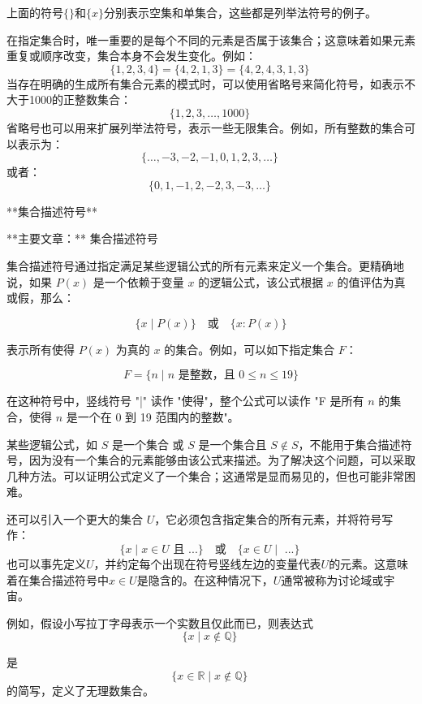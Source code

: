 上面的符号\( \{\} \)和\( \{x\} \)分别表示空集和单集合，这些都是列举法符号的例子。

在指定集合时，唯一重要的是每个不同的元素是否属于该集合；这意味着如果元素重复或顺序改变，集合本身不会发生变化。例如：
\[
\{1, 2, 3, 4\} = \{4, 2, 1, 3\} = \{4, 2, 4, 3, 1, 3\}~
\]
当存在明确的生成所有集合元素的模式时，可以使用省略号来简化符号，如表示不大于1000的正整数集合：
\[
\{1, 2, 3, \ldots, 1000\}~
\]
省略号也可以用来扩展列举法符号，表示一些无限集合。例如，所有整数的集合可以表示为：
\[
\{\ldots, -3, -2, -1, 0, 1, 2, 3, \ldots\}~
\]
或者：
\[
\{0, 1, -1, 2, -2, 3, -3, \ldots\}~
\]

**集合描述符号**

**主要文章：** 集合描述符号

集合描述符号通过指定满足某些逻辑公式的所有元素来定义一个集合。更精确地说，如果 \( P(x) \) 是一个依赖于变量 \( x \) 的逻辑公式，该公式根据 \( x \) 的值评估为真或假，那么：

\[
\{x \mid P(x)\} \quad \text{或} \quad \{x : P(x)\}
\]

表示所有使得 \( P(x) \) 为真的 \( x \) 的集合。例如，可以如下指定集合 \( F \)：

\[
F = \{n \mid n \text{ 是整数，且 } 0 \leq n \leq 19\}
\]

在这种符号中，竖线符号 "|" 读作 "使得"，整个公式可以读作 "F 是所有 \( n \) 的集合，使得 \( n \) 是一个在 0 到 19 范围内的整数"。

某些逻辑公式，如 \( S \) 是一个集合 或 \( S \) 是一个集合且 \( S \notin S \)，不能用于集合描述符号，因为没有一个集合的元素能够由该公式来描述。为了解决这个问题，可以采取几种方法。可以证明公式定义了一个集合；这通常是显而易见的，但也可能非常困难。

还可以引入一个更大的集合 \( U \)，它必须包含指定集合的所有元素，并将符号写作：
\[
\{x \mid x \in U \text{ 且 ...}\} \quad \text{或} \quad \{x \in U \mid \text{ ...}\}~
\]
也可以事先定义\( U \)，并约定每个出现在符号竖线左边的变量代表\( U \)的元素。这意味着在集合描述符号中\( x \in U \)是隐含的。在这种情况下，\( U \)通常被称为讨论域或宇宙。

例如，假设小写拉丁字母表示一个实数且仅此而已，则表达式
\[
\{x \mid x \notin \mathbb{Q}\}~
\]

是
\[
\{x \in \mathbb{R} \mid x \notin \mathbb{Q}\}~
\]
的简写，定义了无理数集合。